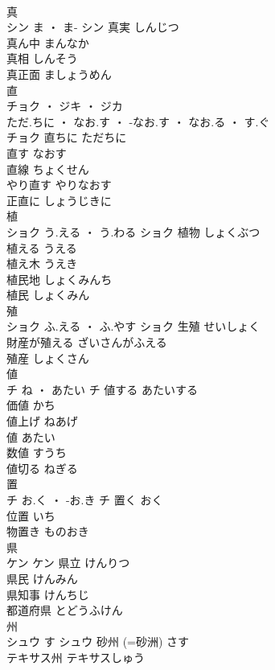 \documentclass[8pt]{extreport}
\begin{document}
\begin{CJK}{UTF8}{min}
\\	真	
\\	シン	ま ・ ま-	シン	真実	しんじつ	
\\	真ん中	まんなか	
\\	真相	しんそう	
\\	真正面	ましょうめん	
\\	直	
\\	チョク ・ ジキ ・ ジカ
\\	ただ.ちに ・ なお.す ・ -なお.す ・ なお.る ・ す.ぐ
\\	チョク	直ちに	ただちに	
\\	直す	なおす	
\\	直線	ちょくせん	
\\	やり直す	やりなおす	
\\	正直に	しょうじきに	
\\	植	
\\	ショク	う.える ・ う.わる	ショク	植物	しょくぶつ	
\\	植える	うえる	
\\	植え木	うえき	
\\	植民地	しょくみんち	
\\	植民	しょくみん	
\\	殖	
\\	ショク	ふ.える ・ ふ.やす	ショク	生殖	せいしょく	
\\	財産が殖える	ざいさんがふえる	
\\	殖産	しょくさん	
\\	値	
\\	チ	ね ・ あたい	チ	値する	あたいする	
\\	価値	かち	
\\	値上げ	ねあげ	
\\	値	あたい	
\\	数値	すうち	
\\	値切る	ねぎる	
\\	置	
\\	チ	お.く ・ -お.き	チ	置く	おく	
\\	位置	いち	
\\	物置き	ものおき	
\\	県	
\\	ケン		ケン	県立	けんりつ	
\\	県民	けんみん	
\\	県知事	けんちじ	
\\	都道府県	とどうふけん	
\\	州	
\\	シュウ	す	シュウ	砂州 (=砂洲)	さす	
\\	テキサス州	テキサスしゅう	

\end{CJK}
\end{document}
